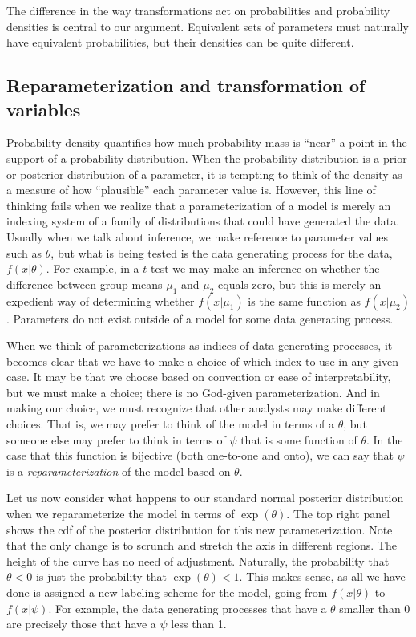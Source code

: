 \documentclass[man]{apa}
\begin{document}
The difference in the way transformations act on probabilities and probability densities is central to our argument. Equivalent sets of parameters must naturally have equivalent probabilities, but their densities can be quite different.

    
   \subsection*{Reparameterization and transformation of variables}
Probability density quantifies how much probability mass is ``near'' a point in the support of a probability distribution. When the probability distribution is a prior or posterior distribution of a parameter, it is tempting to think of the density as a measure of how ``plausible'' each parameter value is. However, this line of thinking fails when we realize that a parameterization of a model is merely an indexing system of a family of distributions that could have generated the data. Usually when we talk about inference, we make reference to parameter values such as $\theta$, but what is being tested is the data generating process for the data, $f(x|\theta)$. For example, in a $t$-test we may make an inference on whether the difference between group means $\mu_1$ and $\mu_2$ equals zero, but this is merely an expedient way of determining whether $f(x|\mu_1)$ is the same function as $f(x|\mu_2)$. Parameters do not exist outside of a model for some data generating process. 

When we think of parameterizations as indices of data generating processes, it becomes clear that we have to make a choice of which index to use in any given case. It may be that we choose based on convention or ease of interpretability, but we must make a choice; there is no God-given parameterization. And in making our choice, we must recognize that other analysts may make different choices. That is, we may prefer to think of the model in terms of a $\theta$, but someone else may prefer to think in terms of $\psi$ that is some function of $\theta$. In the case that this function is bijective (both one-to-one and onto), we can say that $\psi$ is a \textit{reparameterization} of the model based on $\theta$. 

Let us now consider what happens to our standard normal posterior distribution when we reparameterize the model in terms of $\exp{(\theta)}$. 
The top right panel shows the cdf of the posterior distribution for this new parameterization. Note that the only change is to scrunch and stretch the axis in different regions. 
The height of the curve has no need of adjustment. Naturally, the probability that $\theta<0$ is just the probability that $\exp{(\theta)}<1$. This makes sense, as all we have done is assigned a new labeling scheme for the model, going from $f(x|\theta)$ to $f(x|\psi)$.
For example, the data generating processes that have a $\theta$ smaller than 0 are precisely those that have a $\psi$ less than 1. 
 
\end{document}
